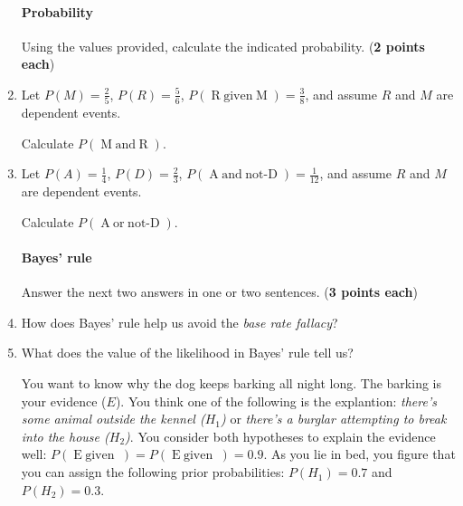 \documentclass[10pt]{article}
\newcommand\negate[1]{\mathop{\mbox{$not$-$#1$}}}
\newcommand\disjoin[2]{\mathop{\mbox{$#1\; or\; #2$}}}
\newcommand\conjoin[2]{\mathop{\mbox{$#1\; and\; #2$}}}
\newcommand\given[2]{\mathop{\mbox{$#1\; given\; #2$}}}
\begin{document}
\begin{enumerate}

\paragraph{Probability}

Using the values provided, calculate the indicated probability. (\textbf{2 points each})

\setlength\itemsep{1.5cm}

\item Let $P(M)=\frac{2}{5}$, $P(R)=\frac{5}{6}$, $P(\given{R}{M})=\frac{3}{8}$, and assume $R$ and $M$ are dependent events. 

Calculate $P(\conjoin{M}{R})$. 

\item Let $P(A)=\frac{1}{4}$, $P(D)=\frac{2}{3}$, $P(\conjoin{A}{\negate{D}})=\frac{1}{12}$, and assume $R$ and $M$ are dependent events. 

Calculate $P(\disjoin{A}{\negate{D}})$.


\vspace{.75cm}

\paragraph{Bayes' rule}

Answer the next two answers in one or two sentences. (\textbf{3 points each})

\setlength\itemsep{1.5cm}

\item How does Bayes' rule help us avoid the \textit{base rate fallacy}?

\item What does the value of the likelihood in Bayes' rule tell us?


\vspace{1.5cm}

You want to know why the dog keeps barking all night long. The barking is your evidence ($E$). You think one of the following is the explantion: \textit{there's some animal outside the kennel ($H_1$)} or \textit{there's a burglar attempting to break into the house ($H_2$)}.  You consider both hypotheses to explain the evidence well: $P(\given{E}{H_1})=P(\given{E}{H_2})=0.9$. As you lie in bed, you figure that you can assign the following prior probabilities: $P(H_1)=0.7$ and $P(H_2)=0.3$. 


\end{enumerate}
\end{document}
